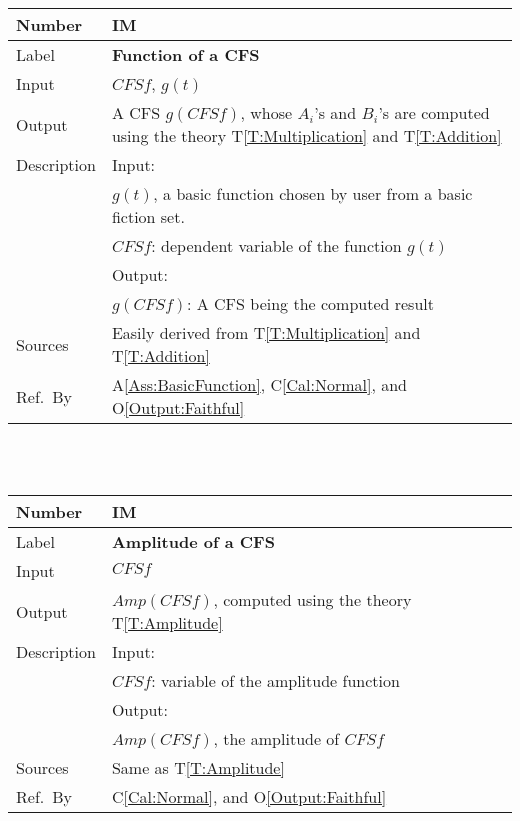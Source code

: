 \documentclass[12pt]{article}
\newcommand{\colAwidth}{0.13\textwidth}
\newcommand{\colBwidth}{0.82\textwidth}
\newcommand{\tref}[1]{T\ref{#1}}
\newcommand{\aref}[1]{A\ref{#1}}
\newcommand{\calref}[1]{C\ref{#1}}
\newcommand{\oref}[1]{O\ref{#1}}
\newcounter{instnum} %
\begin{document}
\noindent
\begin{minipage}{\textwidth}
	\renewcommand*{\arraystretch}{1.5}
	\begin{tabular}{| p{\colAwidth} | p{\colBwidth}|}
		\hline
		\rowcolor[gray]{0.9}
		Number& IM{instnum}\theinstnum \label{IM:Function}\\
		\hline
		Label& \bf Function of a CFS \\
		\hline
		Input& $\mathit{CFSf}$, $g(t)$\\
		\hline
		Output& A CFS $g(CFSf)$, whose $A_i$'s and $B_i$'s are computed using the theory \tref{T:Multiplication} and \tref{T:Addition}\\
		\hline
		Description&Input:\\
		& $g(t)$, a basic function chosen by user from a basic fiction set.\\
		&$\mathit{CFSf}$: dependent variable of the function $g(t)$\\
		&Output:\\
		& $g(CFSf)$: A CFS being the computed result\\
		\hline
		Sources&Easily derived from \tref{T:Multiplication} and \tref{T:Addition}		\\
		\hline
		Ref.\ By & \aref{Ass:BasicFunction}, \calref{Cal:Normal}, and  \oref{Output:Faithful}\\
		\hline
	\end{tabular}
\end{minipage}\\
~\newline

\noindent
\begin{minipage}{\textwidth}
	\renewcommand*{\arraystretch}{1.5}
	\begin{tabular}{| p{\colAwidth} | p{\colBwidth}|}
		\hline
		\rowcolor[gray]{0.9}
		Number& IM{instnum}\theinstnum \label{IM:Amplitude}\\
		\hline
		Label& \bf Amplitude of a CFS \\
		\hline
		Input& $\mathit{CFSf}$\\
		\hline
		Output& $\mathit{Amp}(\mathit{CFSf})$, computed using the theory \tref{T:Amplitude}\\
		\hline
		Description&Input:\\
		&$\mathit{CFSf}$: variable of the amplitude function\\
		&Output:\\
		& $\mathit{Amp}(\mathit{CFSf})$, the amplitude of $\mathit{CFSf}$\\
		\hline
		Sources&Same as \tref{T:Amplitude}		\\
		\hline
		Ref.\ By & \calref{Cal:Normal}, and  \oref{Output:Faithful}\\
		\hline
	\end{tabular}
\end{minipage}\\
~\newline
\end{document}
